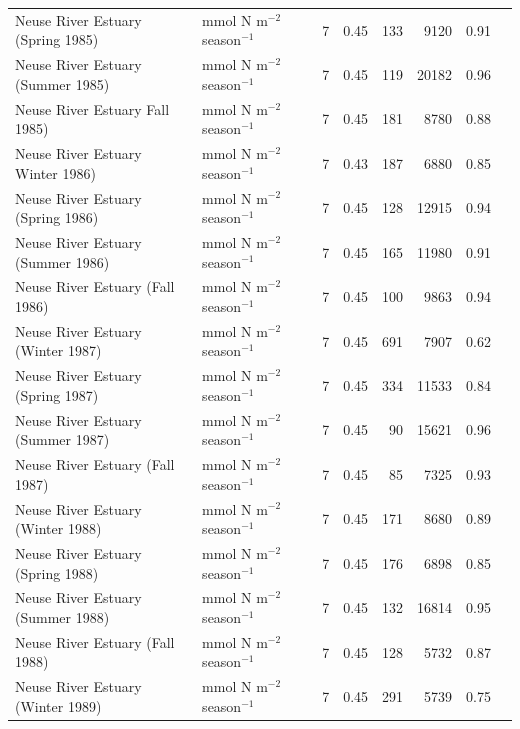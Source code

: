 \documentclass[11pt]{article}
\begin{document}
\begin{table}[ht]
\begin{center}
\begin{tiny}
\begin{tabular}{llrrrrrr}
      Neuse River Estuary (Spring 1985) & mmol N m$^{-2}$ season$^{-1}$ &   7 & 0.45 & 133 & 9120 & 0.91 & \citet{christian03} \\ 
      Neuse River Estuary (Summer 1985) & mmol N m$^{-2}$ season$^{-1}$ &   7 & 0.45 & 119 & 20182 & 0.96 & \citet{christian03} \\ 
      Neuse River Estuary Fall 1985) & mmol N m$^{-2}$ season$^{-1}$ &   7 & 0.45 & 181 & 8780 & 0.88 & \citet{christian03} \\ 
      Neuse River Estuary Winter 1986) & mmol N m$^{-2}$ season$^{-1}$ &   7 & 0.43 & 187 & 6880 & 0.85 & \citet{christian03} \\ 
      Neuse River Estuary (Spring 1986) & mmol N m$^{-2}$ season$^{-1}$ &   7 & 0.45 & 128 & 12915 & 0.94 & \citet{christian03} \\ 
      Neuse River Estuary (Summer 1986) & mmol N m$^{-2}$ season$^{-1}$ &   7 & 0.45 & 165 & 11980 & 0.91 & \citet{christian03} \\ 
      Neuse River Estuary (Fall 1986) & mmol N m$^{-2}$ season$^{-1}$ &   7 & 0.45 & 100 & 9863 & 0.94 & \citet{christian03} \\ 
      Neuse River Estuary (Winter 1987) & mmol N m$^{-2}$ season$^{-1}$ &   7 & 0.45 & 691 & 7907 & 0.62 & \citet{christian03} \\ 
      Neuse River Estuary (Spring 1987) & mmol N m$^{-2}$ season$^{-1}$ &   7 & 0.45 & 334 & 11533 & 0.84 & \citet{christian03} \\ 
      Neuse River Estuary (Summer 1987) & mmol N m$^{-2}$ season$^{-1}$ &   7 & 0.45 &  90 & 15621 & 0.96 & \citet{christian03} \\ 
      Neuse River Estuary (Fall 1987) & mmol N m$^{-2}$ season$^{-1}$ &   7 & 0.45 &  85 & 7325 & 0.93 & \citet{christian03} \\ 
      Neuse River Estuary (Winter 1988) & mmol N m$^{-2}$ season$^{-1}$ &   7 & 0.45 & 171 & 8680 & 0.89 & \citet{christian03} \\ 
      Neuse River Estuary (Spring 1988) & mmol N m$^{-2}$ season$^{-1}$ &   7 & 0.45 & 176 & 6898 & 0.85 & \citet{christian03} \\ 
      Neuse River Estuary (Summer 1988) & mmol N m$^{-2}$ season$^{-1}$ &   7 & 0.45 & 132 & 16814 & 0.95 & \citet{christian03} \\ 
      Neuse River Estuary (Fall 1988) & mmol N m$^{-2}$ season$^{-1}$ &   7 & 0.45 & 128 & 5732 & 0.87 & \citet{christian03} \\ 
      Neuse River Estuary (Winter 1989) & mmol N m$^{-2}$ season$^{-1}$ &   7 & 0.45 & 291 & 5739 & 0.75 & \citet{christian03} \\ 

\end{tabular}
\end{tiny}
\end{center}
\end{table}
\end{document}
